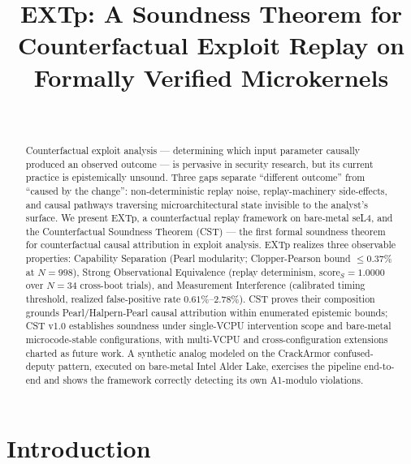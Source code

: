 \documentclass[conference]{IEEEtran}
\newcommand{\scoreS}{\text{score}_S}
\begin{document}
\title{EXTp: A Soundness Theorem for Counterfactual Exploit Replay on Formally Verified Microkernels}

\author{\\
}

\maketitle

\begin{abstract}
Counterfactual exploit analysis --- determining which input
parameter causally produced an observed outcome --- is pervasive
in security research, but its current practice is epistemically
unsound. Three gaps separate ``different outcome'' from ``caused
by the change'': non-deterministic replay noise, replay-machinery
side-effects, and causal pathways traversing microarchitectural
state invisible to the analyst's surface. We present EXTp, a
counterfactual replay framework on bare-metal seL4, and the
Counterfactual Soundness Theorem (CST) --- the first formal
soundness theorem for counterfactual causal attribution in exploit
analysis. EXTp realizes three observable properties: Capability
Separation (Pearl modularity; Clopper-Pearson bound
${\leq}0.37\%$ at $N{=}998$), Strong Observational Equivalence
(replay determinism, $\scoreS{=}1.0000$ over $N{=}34$ cross-boot
trials), and Measurement Interference (calibrated timing threshold,
realized false-positive rate $0.61\%$--$2.78\%$). CST proves their
composition grounds Pearl/Halpern-Pearl causal attribution within
enumerated epistemic bounds; CST v1.0 establishes soundness under
single-VCPU intervention scope and bare-metal microcode-stable
configurations, with multi-VCPU and cross-configuration extensions
charted as future work. A synthetic analog modeled on the
CrackArmor confused-deputy pattern, executed on bare-metal Intel
Alder Lake, exercises the pipeline end-to-end and shows the
framework correctly detecting its own A1-modulo violations.
\end{abstract}

\section{Introduction}\label{sec:intro}
\end{document}

